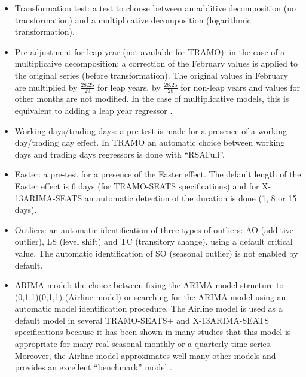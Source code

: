 \documentclass[article]{jss}
\providecommand{\tightlist}{%
  \setlength{\itemsep}{0pt}\setlength{\parskip}{0pt}}
\begin{document}
\begin{itemize}
\tightlist
\item
  Transformation test: a test to choose between an additive
  decomposition (no transformation) and a multiplicative decomposition
  (logarithmic transformation).\\
\item
  Pre-adjustment for leap-year (not available for TRAMO): in the case of
  a multiplicaive decomposition; a correction of the February values is
  applied to the original series (before transformation). The original
  values in February are multiplied by \(\frac{28.25}{29}\) for leap
  years, by \(\frac{28.25}{28}\) for non-leap years and values for other
  months are not modified. In the case of multiplicative models, this is
  equivalent to adding a leap year regressor
  \citep{bell1992lengthmonthadj}.\\
\item
  Working days/trading days: a pre-test is made for a presence of a
  working day/trading day effect. In TRAMO an automatic choice between
  working days and trading days regressors is done with ``RSAFull''.\\
\item
  Easter: a pre-test for a presence of the Easter effect. The default
  length of the Easter effect is 6 days (for TRAMO-SEATS specifications)
  and for X-13ARIMA-SEATS an automatic detection of the duration is done
  (1, 8 or 15 days).\\
\item
  Outliers: an automatic identification of three types of outliers: AO
  (additive outlier), LS (level shift) and TC (transitory change), using
  a default critical value. The automatic identification of SO (seasonal
  outlier) is not enabled by default.\\
\item
  ARIMA model: the choice between fixing the ARIMA model structure to
  (0,1,1)(0,1,1) (Airline model) or searching for the ARIMA model using
  an automatic model identification procedure. The Airline model is used
  as a default model in several TRAMO-SEATS+ and X-13ARIMA-SEATS
  specifications because it has been shown in many studies that this
  model is appropriate for many real seasonal monthly or a quarterly
  time series. Moreover, the Airline model approximates well many other
  models and provides an excellent ``benchmark'' model
  \citep{maravall2009identification}.
\end{itemize}
\end{document}

